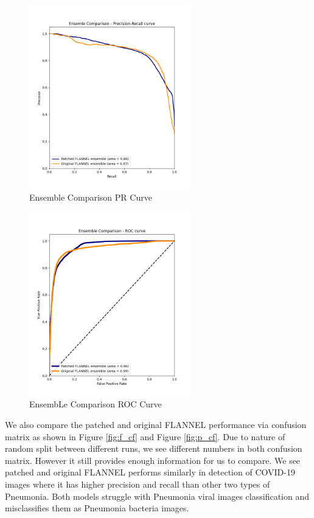 \documentclass{sigkddExp}
\begin{document}
\begin{figure}[h]
    \centering
    \includegraphics[width=7cm]{../doc/images/ensemble_comparison_precision_recall_curve.png}
    \caption{Ensemble Comparison PR Curve}
    \label{fig:ec_prcurve}
\end{figure}


\begin{figure}[h]
    \centering
    \includegraphics[width=7cm]{../doc/images/ensemble_comparison_roc_curve.png}
    \caption{EnsembLe Comparison ROC Curve}
    \label{fig:ec_roccurve}
\end{figure}

We also compare the patched and original FLANNEL performance via confusion
matrix as shown in Figure \ref{fig:f_cf} and Figure \ref{fig:p_cf}. Due to
nature of random split between different runs, we see different numbers in both
confusion matrix. However it still provides enough information for us to compare.
We see patched and original FLANNEL performs similarly in detection of COVID-19 images
where it has higher precision and recall than other two types of Pneumonia. Both
models struggle with Pneumonia viral images classification and misclassifies
them as Pneumonia bacteria images.
\end{document}
